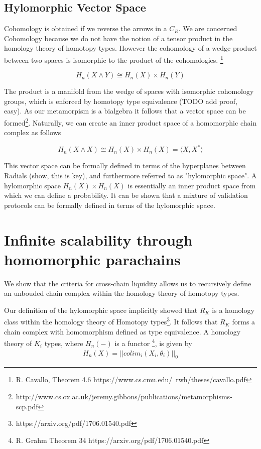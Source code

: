 \documentclass{article}
\begin{document}
\subsection{Hylomorphic Vector Space}
Cohomology is obtained if we reverse the arrows in a $C_R$. We are concerned Cohomology because we do not have the notion of a tensor product in the homology theory of homotopy types. However the cohomology of a wedge product between two spaces is isomorphic to the product of the cohomologies. \footnote{R. Cavallo, Theorem 4.6 https://www.cs.cmu.edu/~rwh/theses/cavallo.pdf}

\begin{equation} \label{eq1}
H_n(X \wedge Y) \cong H_n(X) \times H_n(Y)
\end{equation}

The product is a manifold from the wedge of spaces with isomorphic cohomology groups, which is enforced by homotopy type equivalence (TODO add proof, easy). As our metamorpism is a bialgebra it follows that a vector space can be formed\footnote{http://www.cs.ox.ac.uk/jeremy.gibbons/publications/metamorphisms-scp.pdf}. Naturally, we can create an inner product space of a homomorphic chain complex as follows

\begin{equation} \label{eq1}
H_n(X \wedge X) \cong H_n(X) \times H_n(X) = \langle X, X^* \rangle
\end{equation}

This vector space can be formally defined in terms of the hyperplanes between Radials (show, this is key), and furthermore referred to as "hylomorphic space". A hylomorphic space $H_n(X) \times H_n(X)$ is essentially an inner product space from which we can define a probability. It can be shown that a mixture of validation protocols can be formally defined in terms of the hylomorphic space.

\section{Infinite scalability through homomorphic parachains}
We show that the criteria for cross-chain liquidity allows us to recursively define an unbouded chain complex within the homology theory of homotopy types.

Our definition of the hylomorphic space implicitly showed that $R_K$ is a homology class within the homology theory of Homotopy types\footnote{https://arxiv.org/pdf/1706.01540.pdf}. It follows that $R_K$ forms a chain complex with homomorphism defined as type equivalence. A homology theory of $K_i$ types, where $H_n(-)$ is a functor \footnote{R. Grahm Theorem 34 https://arxiv.org/pdf/1706.01540.pdf}, is given by 
\begin{equation} \label{eq1}
\begin{split}
H_n(X) = || colim_i (X_i,\theta_i) ||_0
\end{split}
\end{equation}
\end{document}
